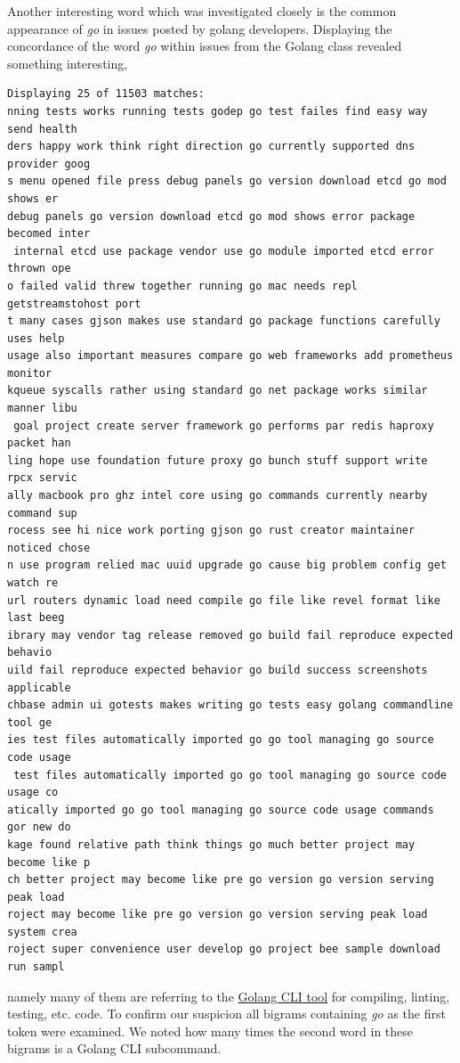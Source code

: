 \documentclass[]{article}
\begin{document}
Another interesting word which was investigated closely is the common appearance of \emph{go} in issues posted by golang developers. Displaying the concordance of the word \emph{go} within issues from the Golang class revealed something interesting,

\begin{verbatim}
Displaying 25 of 11503 matches:
nning tests works running tests godep go test failes find easy way send health
ders happy work think right direction go currently supported dns provider goog
s menu opened file press debug panels go version download etcd go mod shows er
debug panels go version download etcd go mod shows error package becomed inter
 internal etcd use package vendor use go module imported etcd error thrown ope
o failed valid threw together running go mac needs repl getstreamstohost port 
t many cases gjson makes use standard go package functions carefully uses help
usage also important measures compare go web frameworks add prometheus monitor
kqueue syscalls rather using standard go net package works similar manner libu
 goal project create server framework go performs par redis haproxy packet han
ling hope use foundation future proxy go bunch stuff support write rpcx servic
ally macbook pro ghz intel core using go commands currently nearby command sup
rocess see hi nice work porting gjson go rust creator maintainer noticed chose
n use program relied mac uuid upgrade go cause big problem config get watch re
url routers dynamic load need compile go file like revel format like last beeg
ibrary may vendor tag release removed go build fail reproduce expected behavio
uild fail reproduce expected behavior go build success screenshots applicable 
chbase admin ui gotests makes writing go tests easy golang commandline tool ge
ies test files automatically imported go go tool managing go source code usage
 test files automatically imported go go tool managing go source code usage co
atically imported go go tool managing go source code usage commands gor new do
kage found relative path think things go much better project may become like p
ch better project may become like pre go version go version serving peak load 
roject may become like pre go version go version serving peak load system crea
roject super convenience user develop go project bee sample download run sampl
\end{verbatim}

namely many of them are referring to the \href{https://pkg.go.dev/cmd/go}{Golang CLI tool} for compiling, linting, testing, etc. code. To confirm our suspicion all bigrams containing \emph{go} as the first token were examined. We noted how many times the second word in these bigrams is a Golang CLI subcommand.
\end{document}

